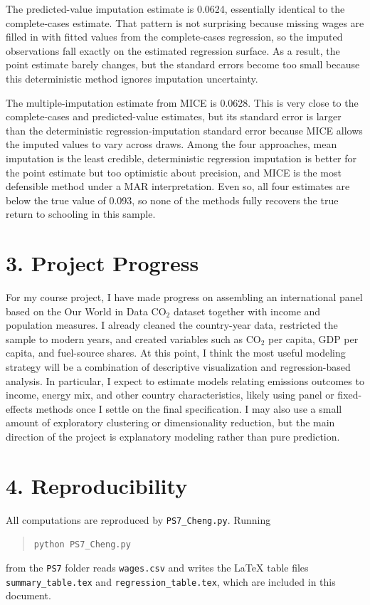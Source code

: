 \documentclass[11pt]{article}
\begin{document}
The predicted-value imputation estimate is 0.0624, essentially identical to the complete-cases estimate.
That pattern is not surprising because missing wages are filled in with fitted values from the complete-cases regression, so the imputed observations fall exactly on the estimated regression surface.
As a result, the point estimate barely changes, but the standard errors become too small because this deterministic method ignores imputation uncertainty.

The multiple-imputation estimate from MICE is 0.0628.
This is very close to the complete-cases and predicted-value estimates, but its standard error is larger than the deterministic regression-imputation standard error because MICE allows the imputed values to vary across draws.
Among the four approaches, mean imputation is the least credible, deterministic regression imputation is better for the point estimate but too optimistic about precision, and MICE is the most defensible method under a MAR interpretation.
Even so, all four estimates are below the true value of 0.093, so none of the methods fully recovers the true return to schooling in this sample.

\section*{3. Project Progress}
For my course project, I have made progress on assembling an international panel based on the Our World in Data CO\(_2\) dataset together with income and population measures.
I already cleaned the country-year data, restricted the sample to modern years, and created variables such as CO\(_2\) per capita, GDP per capita, and fuel-source shares.
At this point, I think the most useful modeling strategy will be a combination of descriptive visualization and regression-based analysis.
In particular, I expect to estimate models relating emissions outcomes to income, energy mix, and other country characteristics, likely using panel or fixed-effects methods once I settle on the final specification.
I may also use a small amount of exploratory clustering or dimensionality reduction, but the main direction of the project is explanatory modeling rather than pure prediction.

\section*{4. Reproducibility}
All computations are reproduced by \texttt{PS7\_Cheng.py}.
Running
\begin{quote}
\texttt{python PS7\_Cheng.py}
\end{quote}
from the \texttt{PS7} folder reads \texttt{wages.csv} and writes the LaTeX table files \texttt{summary\_table.tex} and \texttt{regression\_table.tex}, which are included in this document.
\end{document}
